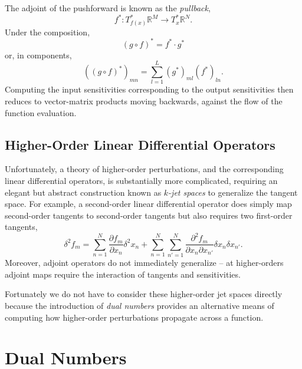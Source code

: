 The adjoint of the pushforward is known as the \textit{pullback},
%
\begin{equation*}
f^{*} : T^{*}_{f (x) } \mathbb{R}^{M} \rightarrow T^{*}_{x} \mathbb{R}^{N}.
\end{equation*}
%
Under the composition,
%
\begin{equation*}
\left( g \circ f \right)^{*} = f^{*} \cdot g^{*}
\end{equation*}
%
or, in components,
%
\begin{equation*}
\left( \left( g \circ f \right)^{*} \right)_{mn} = 
\sum_{l = 1}^{L} \left( g^{*} \right)_{ml} \left( f^{*} \right)_{ln}.
\end{equation*}
%
Computing the input sensitivities corresponding to the output sensitivities then reduces
to vector-matrix products moving backwards, against the flow of the function evaluation.

\subsection{Higher-Order Linear Differential Operators}

Unfortunately, a theory of higher-order perturbations, and the corresponding
linear differential operators, is substantially more complicated, requiring an elegant but
abstract construction known as \textit{$k$-jet spaces} to generalize the tangent space.  
For example, a second-order linear differential operator does simply map second-order 
tangents to second-order tangents but also requires two first-order tangents,
%
 \begin{equation*}
\delta^{2} f_{m} 
= \sum_{n = 1}^{N} \frac{ \partial f_{m} }{ \partial x_{n} } \delta^{2} x_{n} 
+ \sum_{n = 1}^{N} \sum_{n' = 1}^{N} 
\frac{ \partial^{2} f_{m} }{ \partial x_{n} \partial x_{n'} } 
\delta x_{n} \delta x_{n'}.
\end{equation*}
%
Moreover, adjoint operators do not immediately generalize -- at higher-orders adjoint
maps require the interaction of tangents and sensitivities.

Fortunately we do not have to consider these higher-order jet spaces directly
because the introduction of \textit{dual numbers} provides an alternative means
of computing how higher-order perturbations propagate across a function.

\section{Dual Numbers}

